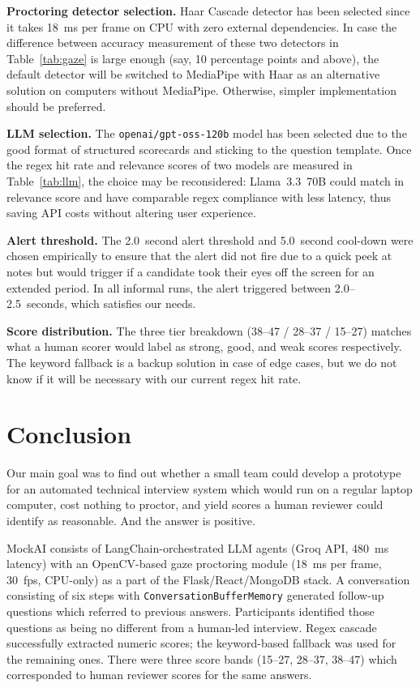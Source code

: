 \documentclass[conference]{IEEEtran}
\begin{document}
\textbf{Proctoring detector selection.}
Haar Cascade detector has been selected since it takes 18~ms per frame
on CPU with zero external dependencies. In case the difference between
accuracy measurement of these two detectors in Table~\ref{tab:gaze} is
large enough (say, 10 percentage points and above), the default
detector will be switched to MediaPipe with Haar as an alternative
solution on computers without MediaPipe. Otherwise, simpler
implementation should be preferred.

\textbf{LLM selection.}
The \texttt{openai/gpt-oss-120b} model has been selected due to the
good format of structured scorecards and sticking to the question
template. Once the regex hit rate and relevance scores of two models
are measured in Table~\ref{tab:llm}, the choice may be reconsidered:
Llama~3.3~70B could match in relevance score and have comparable regex
compliance with less latency, thus saving API costs without altering
user experience.

\textbf{Alert threshold.}
The 2.0~second alert threshold and 5.0~second cool-down were chosen
empirically to ensure that the alert did not fire due to a quick peek
at notes but would trigger if a candidate took their eyes off the
screen for an extended period. In all informal runs, the alert
triggered between 2.0--2.5~seconds, which satisfies our needs.

\textbf{Score distribution.}
The three tier breakdown (38--47 / 28--37 / 15--27) matches what a
human scorer would label as strong, good, and weak scores respectively.
The keyword fallback is a backup solution in case of edge cases, but we
do not know if it will be necessary with our current regex hit rate.

\section{Conclusion}

Our main goal was to find out whether a small team could develop a
prototype for an automated technical interview system which would run
on a regular laptop computer, cost nothing to proctor, and yield scores
a human reviewer could identify as reasonable. And the answer is
positive.

MockAI consists of LangChain-orchestrated LLM agents (Groq API,
480~ms latency) with an OpenCV-based gaze proctoring module (18~ms per
frame, 30~fps, CPU-only) as a part of the Flask/React/MongoDB stack.
A conversation consisting of six steps with
\texttt{ConversationBufferMemory} generated follow-up questions which
referred to previous answers. Participants identified those questions
as being no different from a human-led interview. Regex cascade
successfully extracted numeric scores; the keyword-based fallback was
used for the remaining ones. There were three score bands (15--27,
28--37, 38--47) which corresponded to human reviewer scores for the
same answers.
\end{document}
